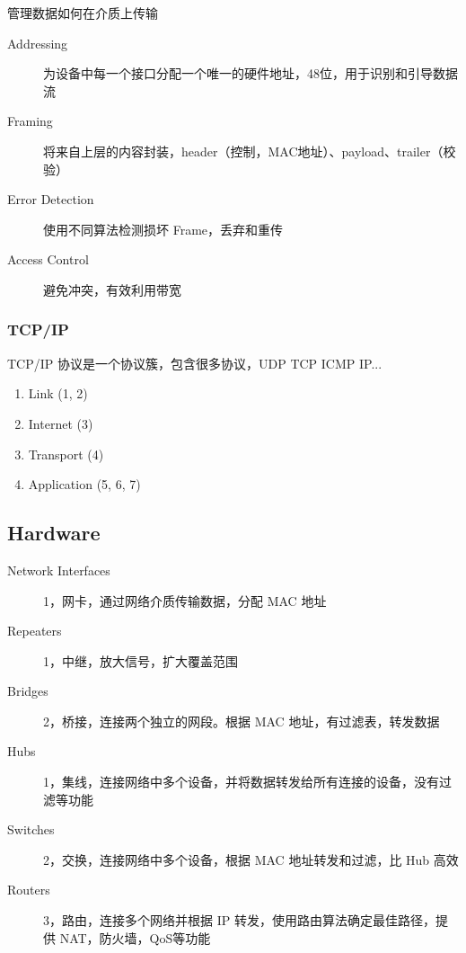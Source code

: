 \documentclass[11pt,journal,compsoc]{IEEEtran}
\begin{document}
管理数据如何在介质上传输

\begin{description}
    \item[Addressing] 为设备中每一个接口分配一个唯一的硬件地址，48位，用于识别和引导数据流

    \item[Framing] 将来自上层的内容封装，header（控制，MAC地址）、payload、trailer（校验）

    \item[Error Detection] 使用不同算法检测损坏 Frame，丢弃和重传

    \item[Access Control] 避免冲突，有效利用带宽
\end{description}


\subsubsection{TCP/IP}

TCP/IP 协议是一个协议簇，包含很多协议，UDP TCP ICMP IP...

\begin{enumerate}
    \item Link (1, 2)
    \item Internet (3)
    \item Transport (4)
    \item Application (5, 6, 7)
\end{enumerate}


\subsection{Hardware}

\begin{description}
    \item[Network Interfaces] 1，网卡，通过网络介质传输数据，分配 MAC 地址

    \item[Repeaters] 1，中继，放大信号，扩大覆盖范围

    \item[Bridges] 2，桥接，连接两个独立的网段。根据 MAC 地址，有过滤表，转发数据

    \item[Hubs] 1，集线，连接网络中多个设备，并将数据转发给所有连接的设备，没有过滤等功能

    \item[Switches] 2，交换，连接网络中多个设备，根据 MAC 地址转发和过滤，比 Hub 高效

    \item[Routers] 3，路由，连接多个网络并根据 IP 转发，使用路由算法确定最佳路径，提供 NAT，防火墙，QoS等功能
\end{description}
\end{document}
